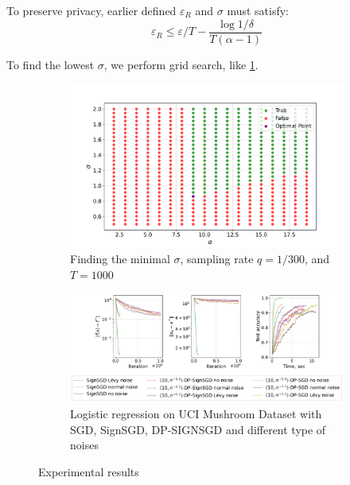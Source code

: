 \documentclass[a4paper, 12pt]{article}
\newcommand{\eps}{\varepsilon}
\begin{document}
To preserve privacy, earlier defined $\eps_R$ and $\sigma$ must satisfy:
\begin{equation}\label{eq:renyi_eps_requirement}
\eps_R \leq \eps/T - \frac{\log 1/\delta}{T(\alpha - 1)}
\end{equation}

To find the lowest $\sigma$, we perform grid search, like \cref{fig:grid_sigma}.
\begin{figure}[h]
    \centering
    \begin{subfigure}[b]{0.39\textwidth}
        \centering
        \includegraphics[width=\textwidth]{grid_sigma_to_pres.pdf}
        \caption{Finding the minimal $\sigma$, sampling rate $q = 1/300$, and $T = 1000$}
        \label{fig:grid_sigma}
    \end{subfigure}
    \hfill
    \begin{subfigure}[b]{0.6\textwidth}
        \centering
        \includegraphics[width=\textwidth]{v28_constant_step/short/v28_constant_step_short.pdf}
        \caption{Logistic regression on UCI Mushroom Dataset with SGD, SignSGD, {\scriptsize DP-SIGN}SGD and different type of noises}
        \label{fig:logreg}
    \end{subfigure}
    \caption{Experimental results}
\end{figure}
\end{document}
